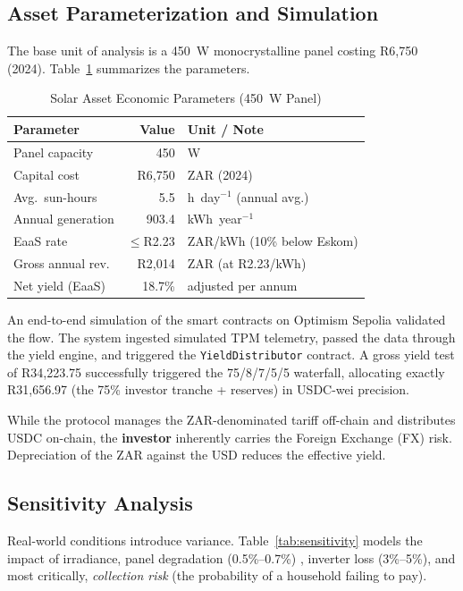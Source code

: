 \documentclass[conference]{IEEEtran}
\begin{document}
\subsection{Asset Parameterization and Simulation}
The base unit of analysis is a 450~W monocrystalline panel costing R6,750 (2024). Table~\ref{tab:params} summarizes the parameters.

\begin{table}[h]
\caption{Solar Asset Economic Parameters (450~W Panel)}
\label{tab:params}
\begin{center}
\renewcommand{\arraystretch}{1.2}
\begin{tabular}{lrl}
\toprule
\textbf{Parameter} & \textbf{Value} & \textbf{Unit / Note} \\
\midrule
Panel capacity    & 450            & W \\
Capital cost      & R6,750         & ZAR (2024) \\
Avg.\ sun-hours   & 5.5            & h~day$^{-1}$ (annual avg.) \\
Annual generation & 903.4          & kWh~year$^{-1}$ \\
EaaS rate         & $\leq$R2.23    & ZAR/kWh (10\% below Eskom) \\
Gross annual rev. & R2,014         & ZAR (at R2.23/kWh) \\
Net yield (EaaS)  & 18.7\%         & adjusted per annum \\
\bottomrule
\end{tabular}
\end{center}
\end{table}

An end-to-end simulation of the smart contracts on Optimism Sepolia validated the flow. The system ingested simulated TPM telemetry, passed the data through the yield engine, and triggered the \texttt{YieldDistributor} contract. A gross yield test of R34,223.75 successfully triggered the 75/8/7/5/5 waterfall, allocating exactly R31,656.97 (the 75\% investor tranche + reserves) in USDC-wei precision. 

While the protocol manages the ZAR-denominated tariff off-chain and distributes USDC on-chain, the \textbf{investor} inherently carries the Foreign Exchange (FX) risk. Depreciation of the ZAR against the USD reduces the effective yield.

\subsection{Sensitivity Analysis}
Real-world conditions introduce variance. Table~\ref{tab:sensitivity} models the impact of irradiance, panel degradation (0.5\%--0.7\%) \cite{vartiainen2020lcoe}, inverter loss (3\%--5\%), and most critically, \emph{collection risk} (the probability of a household failing to pay).
\end{document}
